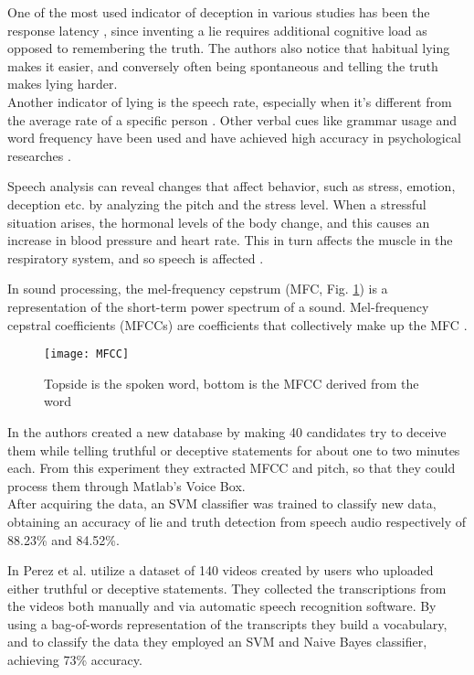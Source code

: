 One of the most used indicator of deception in various studies has been the response latency \cite{EaseLying}, since inventing a lie requires additional cognitive load as opposed to remembering the truth. The authors also notice that habitual lying makes it easier, and conversely often being spontaneous and telling the truth makes lying harder.\\
Another indicator of lying is the speech rate, especially when it's different from the average rate of a specific person \cite{TemporalCues}. Other verbal cues like grammar usage and word frequency have been used and have achieved high accuracy in psychological researches \cite{PorterTruthLying}.

Speech analysis can reveal changes that affect behavior, such as stress, emotion, deception etc. by analyzing the pitch and the stress level. When a stressful situation arises, the hormonal levels of the body change, and this causes an increase in blood pressure and heart rate. This in turn affects the muscle in the respiratory system, and so speech is affected \cite{norena}.

In sound processing, the mel-frequency cepstrum (MFC, Fig. \ref{fig:MFCC}) is a representation of the short-term power spectrum of a sound. Mel-frequency cepstral coefficients (MFCCs) are coefficients that collectively make up the MFC \cite{wiki:mfcc}.

\begin{figure}[H]
	\centering
	\texttt{[image: MFCC]}
	\caption{Topside is the spoken word, bottom is the MFCC derived from the word}
	\label{fig:MFCC}
\end{figure}

In \cite{relidss} the authors created a new database by making 40 candidates try to deceive them while telling truthful or deceptive statements for about one to two minutes each. From this experiment they extracted MFCC and pitch, so that they could process them through Matlab's Voice Box. \\
After acquiring the data, an SVM classifier was trained to classify new data, obtaining an accuracy of lie and truth detection from speech audio respectively of 88.23\% and 84.52\%.

In \cite{Mihalcea:2013:ADD:2522848.2522888} Perez et al. utilize a dataset of 140 videos created by users who uploaded either truthful or deceptive statements. They collected the transcriptions from the videos both manually and via automatic speech recognition software. By using a bag-of-words representation of the transcripts they build a vocabulary, and to classify the data they employed an SVM and Naive Bayes classifier, achieving 73\% accuracy.

